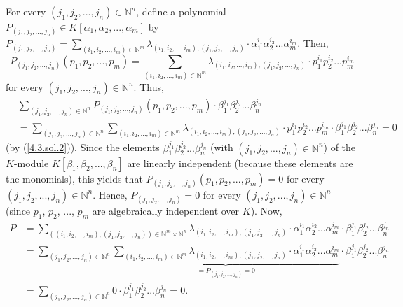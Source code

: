 \documentclass[numbers=enddot,12pt,final,onecolumn,notitlepage]{scrartcl}%
\begin{document}
For every $\left(  j_{1},j_{2},...,j_{n}\right)  \in\mathbb{N}^{n}$, define a
polynomial $P_{\left(  j_{1},j_{2},...,j_{n}\right)  }\in K\left[  \alpha
_{1},\alpha_{2},...,\alpha_{m}\right]  $ by $P_{\left(  j_{1},j_{2}%
,...,j_{n}\right)  }=\sum\limits_{\left(  i_{1},i_{2},...,i_{m}\right)
\in\mathbb{N}^{m}}\lambda_{\left(  i_{1},i_{2},...,i_{m}\right)  ,\left(
j_{1},j_{2},...,j_{n}\right)  }\cdot\alpha_{1}^{i_{1}}\alpha_{2}^{i_{2}%
}...\alpha_{m}^{i_{m}}$. Then,
\[
P_{\left(  j_{1},j_{2},...,j_{n}\right)  }\left(  p_{1},p_{2},...,p_{m}%
\right)  =\sum\limits_{\left(  i_{1},i_{2},...,i_{m}\right)  \in\mathbb{N}%
^{m}}\lambda_{\left(  i_{1},i_{2},...,i_{m}\right)  ,\left(  j_{1}%
,j_{2},...,j_{n}\right)  }\cdot p_{1}^{i_{1}}p_{2}^{i_{2}}...p_{m}^{i_{m}}
\]
for every $\left(  j_{1},j_{2},...,j_{n}\right)  \in\mathbb{N}^{n}$. Thus,%
\begin{align*}
&  \sum\limits_{\left(  j_{1},j_{2},...,j_{n}\right)  \in\mathbb{N}^{n}%
}P_{\left(  j_{1},j_{2},...,j_{n}\right)  }\left(  p_{1},p_{2},...,p_{m}%
\right)  \cdot\beta_{1}^{j_{1}}\beta_{2}^{j_{2}}...\beta_{n}^{j_{n}}\\
&  =\sum\limits_{\left(  j_{1},j_{2},...,j_{n}\right)  \in\mathbb{N}^{n}}%
\sum\limits_{\left(  i_{1},i_{2},...,i_{m}\right)  \in\mathbb{N}^{m}}%
\lambda_{\left(  i_{1},i_{2},...,i_{m}\right)  ,\left(  j_{1},j_{2}%
,...,j_{n}\right)  }\cdot p_{1}^{i_{1}}p_{2}^{i_{2}}...p_{m}^{i_{m}}\cdot
\beta_{1}^{j_{1}}\beta_{2}^{j_{2}}...\beta_{n}^{j_{n}}=0
\end{align*}
(by (\ref{4.3.sol.2})). Since the elements $\beta_{1}^{j_{1}}\beta_{2}^{j_{2}%
}...\beta_{n}^{j_{n}}$ (with $\left(  j_{1},j_{2},...,j_{n}\right)
\in\mathbb{N}^{n}$) of the $K$-module $K\left[  \beta_{1},\beta_{2}%
,...,\beta_{n}\right]  $ are linearly independent (because these elements are
the monomials), this yields that $P_{\left(  j_{1},j_{2},...,j_{n}\right)
}\left(  p_{1},p_{2},...,p_{m}\right)  =0$ for every $\left(  j_{1}%
,j_{2},...,j_{n}\right)  \in\mathbb{N}^{n}$. Hence, $P_{\left(  j_{1}%
,j_{2},...,j_{n}\right)  }=0$ for every $\left(  j_{1},j_{2},...,j_{n}\right)
\in\mathbb{N}^{n}$ (since $p_{1}$, $p_{2}$, $...$, $p_{m}$ are algebraically
independent over $K$). Now,%
\begin{align*}
P  &  =\sum\limits_{\left(  \left(  i_{1},i_{2},...,i_{m}\right)  ,\left(
j_{1},j_{2},...,j_{n}\right)  \right)  \in\mathbb{N}^{m}\times\mathbb{N}^{n}%
}\lambda_{\left(  i_{1},i_{2},...,i_{m}\right)  ,\left(  j_{1},j_{2}%
,...,j_{n}\right)  }\cdot\alpha_{1}^{i_{1}}\alpha_{2}^{i_{2}}...\alpha
_{m}^{i_{m}}\cdot\beta_{1}^{j_{1}}\beta_{2}^{j_{2}}...\beta_{n}^{j_{n}}\\
&  =\sum\limits_{\left(  j_{1},j_{2},...,j_{n}\right)  \in\mathbb{N}^{n}%
}\underbrace{\sum\limits_{\left(  i_{1},i_{2},...,i_{m}\right)  \in
\mathbb{N}^{m}}\lambda_{\left(  i_{1},i_{2},...,i_{m}\right)  ,\left(
j_{1},j_{2},...,j_{n}\right)  }\cdot\alpha_{1}^{i_{1}}\alpha_{2}^{i_{2}%
}...\alpha_{m}^{i_{m}}}_{=P_{\left(  j_{1},j_{2},...,j_{n}\right)  }=0}%
\cdot\beta_{1}^{j_{1}}\beta_{2}^{j_{2}}...\beta_{n}^{j_{n}}\\
&  =\sum\limits_{\left(  j_{1},j_{2},...,j_{n}\right)  \in\mathbb{N}^{n}%
}0\cdot\beta_{1}^{j_{1}}\beta_{2}^{j_{2}}...\beta_{n}^{j_{n}}=0.
\end{align*}
\end{document}
